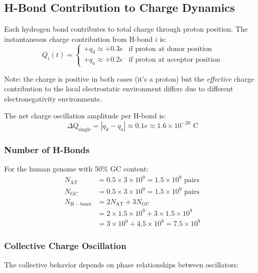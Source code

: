 \documentclass[twocolumn,10pt]{article}
\theoremstyle{remark}
\begin{document}
\subsection{H-Bond Contribution to Charge Dynamics}

Each hydrogen bond contributes to total charge through proton position. The instantaneous charge contribution from H-bond $i$ is:
\begin{equation}
Q_i(t) = \begin{cases}
+q_d \approx +0.3e & \text{if proton at donor position} \\
+q_a \approx +0.2e & \text{if proton at acceptor position}
\end{cases}
\end{equation}

Note: the charge is positive in both cases (it's a proton) but the \textit{effective} charge contribution to the local electrostatic environment differs due to different electronegativity environments.

The net charge oscillation amplitude per H-bond is:
\begin{equation}
\Delta Q_{\mathrm{single}} = |q_d - q_a| \approx 0.1e \approx 1.6 \times 10^{-20} \text{ C}
\end{equation}

\subsubsection{Number of H-Bonds}

For the human genome with 50\% GC content:
\begin{align}
N_{\mathrm{AT}} &= 0.5 \times 3 \times 10^9 = 1.5 \times 10^9 \text{ pairs} \\
N_{\mathrm{GC}} &= 0.5 \times 3 \times 10^9 = 1.5 \times 10^9 \text{ pairs} \\
N_{\mathrm{H-bond}} &= 2 N_{\mathrm{AT}} + 3 N_{\mathrm{GC}} \\
&= 2 \times 1.5 \times 10^9 + 3 \times 1.5 \times 10^9 \\
&= 3 \times 10^9 + 4.5 \times 10^9 = 7.5 \times 10^9
\end{align}

\subsubsection{Collective Charge Oscillation}

The collective behavior depends on phase relationships between oscillators:
\end{document}
